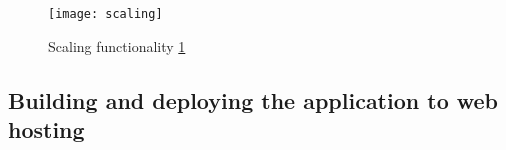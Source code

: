 \begin{figure}[ht!]
\centering
\texttt{[image: scaling]}
\caption{Scaling functionality \ref{r:6}}
\label{r:6}
\end{figure}

\subsection{Building and deploying the application to web hosting}


%
%
%
%

